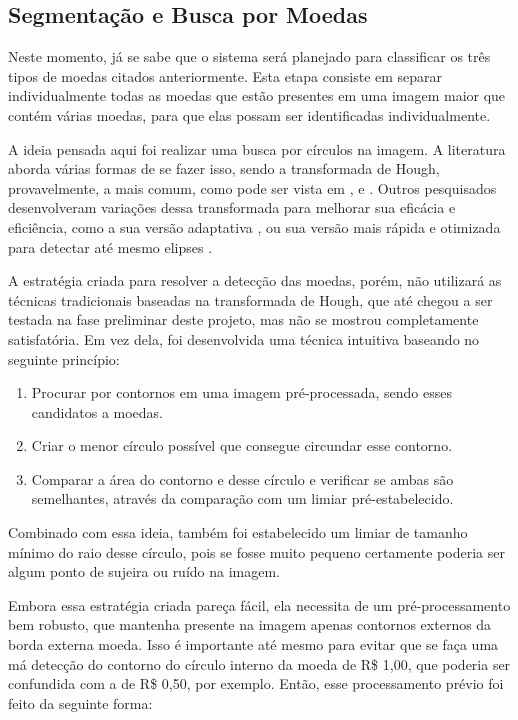 \documentclass[10pt,journal,compsoc]{IEEEtran}
\begin{document}
\subsection{Segmentação e Busca por Moedas}
\label{sec:segmentacao}

Neste momento, já se sabe que o sistema será planejado para classificar os três tipos de moedas citados anteriormente. Esta etapa consiste em separar individualmente todas as moedas que estão presentes em uma imagem maior que contém várias moedas, para que elas possam ser identificadas individualmente.

A ideia pensada aqui foi realizar uma busca por círculos na imagem. A literatura aborda várias formas de se fazer isso, sendo a transformada de Hough, provavelmente, a mais comum, como pode ser vista em \cite{ioannou1999circle}, \cite{kerbyson1995circle} e \cite{yuen1990comparative}. Outros pesquisados desenvolveram variações dessa transformada para melhorar sua eficácia e eficiência, como a sua versão adaptativa \cite{illingworth1987adaptive}, ou sua versão mais rápida e otimizada para detectar até mesmo elipses \cite{guil1997lower}.

A estratégia criada para resolver a detecção das moedas, porém, não utilizará as técnicas tradicionais baseadas na transformada de Hough, que até chegou a ser testada na fase preliminar deste projeto, mas não se mostrou completamente satisfatória. Em vez dela, foi desenvolvida uma técnica intuitiva baseando no seguinte princípio:

\begin{enumerate}
\item Procurar por contornos em uma imagem pré-processada, sendo esses candidatos a moedas.
\item Criar o menor círculo possível que consegue circundar esse contorno.
\item Comparar a área do contorno e desse círculo e verificar se ambas são semelhantes, através da comparação com um limiar pré-estabelecido.
\end{enumerate}

Combinado com essa ideia, também foi estabelecido um limiar de tamanho mínimo do raio desse círculo, pois se fosse muito pequeno certamente poderia ser algum ponto de sujeira ou ruído na imagem.

Embora essa estratégia criada pareça fácil, ela necessita de um pré-processamento bem robusto, que mantenha presente na imagem apenas contornos externos da borda externa moeda. Isso é importante até mesmo para evitar que se faça uma má detecção do contorno do círculo interno da moeda de R\$ 1,00, que poderia ser confundida com a de R\$ 0,50, por exemplo. Então, esse processamento prévio foi feito da seguinte forma:
\end{document}
